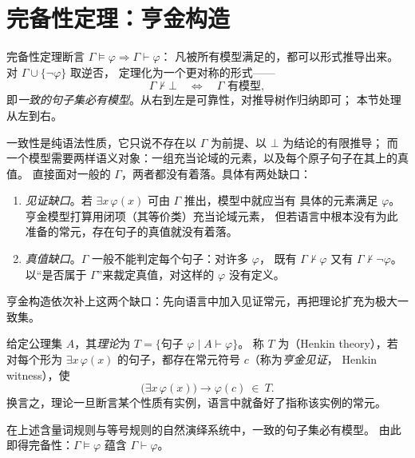 \section{完备性定理：亨金构造}\label{sec:henkin}

\begin{strand}
完备性定理断言 $\Gamma\models\varphi\Rightarrow\Gamma\vdash\varphi$：
凡被所有模型满足的，都可以形式推导出来。对 $\Gamma\cup\{\neg\varphi\}$ 取逆否，
定理化为一个更对称的形式——
\[
  \Gamma\nvdash\bot \quad\Longleftrightarrow\quad \Gamma\text{ 有模型},
\]
即\emph{一致的句子集必有模型}。从右到左是可靠性，对推导树作归纳即可；
本节处理从左到右。
\end{strand}

一致性是纯语法性质，它只说不存在以 $\Gamma$ 为前提、以 $\bot$ 为结论的有限推导；
而一个模型需要两样语义对象：一组充当论域的元素，以及每个原子句子在其上的真值。
直接面对一般的 $\Gamma$，两者都没有着落。具体有两处缺口：
\begin{enumerate}[label=(\alph*),leftmargin=1.8em,itemsep=1pt]
  \item \emph{见证缺口}。若 $\exists x\,\varphi(x)$ 可由 $\Gamma$ 推出，模型中就应当有
        具体的元素满足 $\varphi$。亨金模型打算用闭项（其等价类）充当论域元素，
        但若语言中根本没有为此准备的常元，存在句子的真值就没有着落。
  \item \emph{真值缺口}。$\Gamma$ 一般不能判定每个句子：对许多 $\varphi$，
        既有 $\Gamma\nvdash\varphi$ 又有 $\Gamma\nvdash\neg\varphi$。
        以“是否属于 $\Gamma$”来裁定真值，对这样的 $\varphi$ 没有定义。
\end{enumerate}
亨金构造依次补上这两个缺口：先向语言中加入见证常元，再把理论扩充为极大一致集。

\begin{definition}[理论、亨金系统]
给定公理集 $A$，其\emph{理论}为 $T=\{\text{句子 }\varphi\mid A\vdash\varphi\}$。
称 $T$ 为（Henkin theory），若对每个形为
$\exists x\,\varphi(x)$ 的句子，都存在常元符号 $c$（称为\emph{亨金见证}，
Henkin witness），使
\[
  \bigl(\exists x\,\varphi(x)\bigr)\longrightarrow\varphi(c)\ \in\ T.
\]
换言之，理论一旦断言某个性质有实例，语言中就备好了指称该实例的常元。
\end{definition}

\begin{theorem}[模型存在定理]\label{thm:completeness}
在上述含量词规则与等号规则的自然演绎系统中，一致的句子集必有模型。
由此即得完备性：$\Gamma\models\varphi$ 蕴含 $\Gamma\vdash\varphi$。
\end{theorem}

